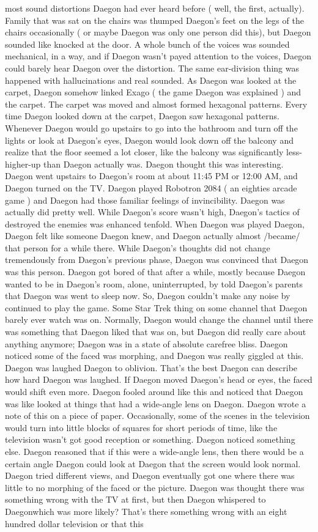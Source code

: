 \documentclass[12pt]{book}
\begin{document}
most sound distortions Daegon had ever heard before ( well, the first, actually). Family that was sat on the chairs was thumped Daegon's feet on the legs of the chairs occasionally ( or maybe Daegon was only one person did this), but Daegon sounded like knocked at the door. A whole bunch of the voices was sounded mechanical, in a way, and if Daegon wasn't payed attention to the voices, Daegon could barely hear Daegon over the distortion. The same ear-division thing was happened with hallucinations and real sounded. As Daegon was looked at the carpet, Daegon somehow linked Exago ( the game Daegon was explained ) and the carpet. The carpet was moved and almost formed hexagonal patterns. Every time Daegon looked down at the carpet, Daegon saw hexagonal patterns. Whenever Daegon would go upstairs to go into the bathroom and turn off the lights or look at Daegon's eyes, Daegon would look down off the balcony and realize that the floor seemed a lot closer, like the balcony was significantly less-higher-up than Daegon actually was. Daegon thought this was interesting. Daegon went upstairs to Daegon's room at about 11:45 PM or 12:00 AM, and Daegon turned on the TV. Daegon played Robotron 2084 ( an eighties arcade game ) and Daegon had those familiar feelings of invincibility. Daegon was actually did pretty well. While Daegon's score wasn't high, Daegon's tactics of destroyed the enemies was enhanced tenfold. When Daegon was played Daegon, Daegon felt like someone Daegon knew, and Daegon actually almost /became/ that person for a while there. While Daegon's thoughts did not change tremendously from Daegon's previous phase, Daegon was convinced that Daegon was this person. Daegon got bored of that after a while, mostly because Daegon wanted to be in Daegon's room, alone, uninterrupted, by told Daegon's parents that Daegon was went to sleep now. So, Daegon couldn't make any noise by continued to play the game. Some Star Trek thing on some channel that Daegon barely ever watch was on. Normally, Daegon would change the channel until there was something that Daegon liked that was on, but Daegon did really care about anything anymore; Daegon was in a state of absolute carefree bliss. Daegon noticed some of the faced was morphing, and Daegon was really giggled at this. Daegon was laughed Daegon to oblivion. That's the best Daegon can describe how hard Daegon was laughed. If Daegon moved Daegon's head or eyes, the faced would shift even more. Daegon fooled around like this and noticed that Daegon was like looked at things that had a wide-angle lens on Daegon. Daegon wrote a note of this on a piece of paper. Occasionally, some of the scenes in the television would turn into little blocks of squares for short periods of time, like the television wasn't got good reception or something. Daegon noticed something else. Daegon reasoned that if this were a wide-angle lens, then there would be a certain angle Daegon could look at Daegon that the screen would look normal. Daegon tried different views, and Daegon eventually got one where there was little to no morphing of the faced or the picture. Daegon was thought there was something wrong with the TV at first, but then Daegon whispered to Daegonwhich was more likely? That's there something wrong with an eight hundred dollar television or that this 
\end{document}
